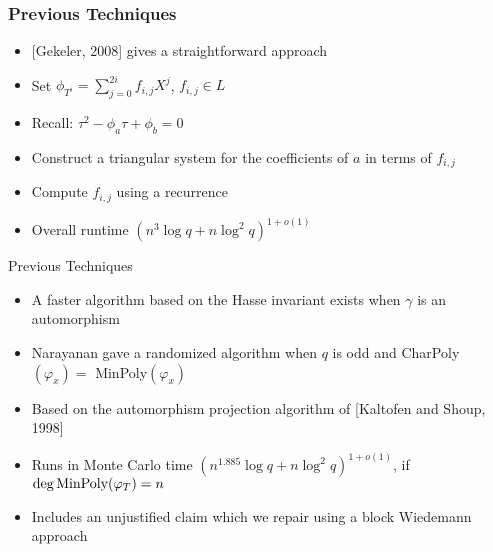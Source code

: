 \documentclass{beamer}
\begin{document}
\begin{frame}
\frametitle{Previous Techniques}

\begin{itemize}
    \item $[$Gekeler, 2008] gives a straightforward approach
    \item Set $\phi_{T^i} = \sum_{j=0}^{2i}f_{i,j} X^j$, $f_{i,j} \in L$
    \item Recall: $\tau^2 - \phi_a\tau + \phi_b = 0$
    \item Construct a triangular system for the coefficients of $a$ in terms of $f_{i,j}$
    \item Compute $f_{i,j}$ using a recurrence
    \item Overall runtime $(n^3 \log q + n\log^2 q)^{1 + o(1)}$
\end{itemize}


\end{frame}









\begin{frame}{Previous Techniques}
\begin{itemize}

\item A faster algorithm based on the Hasse invariant exists when $\gamma$ is an automorphism
\item Narayanan gave a randomized algorithm when $q$ is odd and  CharPoly$(\varphi_x) = $ MinPoly$(\varphi_x)$
\item Based on the automorphism projection algorithm of [Kaltofen and Shoup, 1998]
\item Runs in Monte Carlo time $(n^{1.885} \log q + n \log^2 q)^{1+o(1)}$,
  if $ \deg \textnormal{MinPoly}(\varphi_T) = n$
\item Includes an unjustified claim which we repair using a block Wiedemann approach
\end{itemize}
\end{frame}




\end{document}
